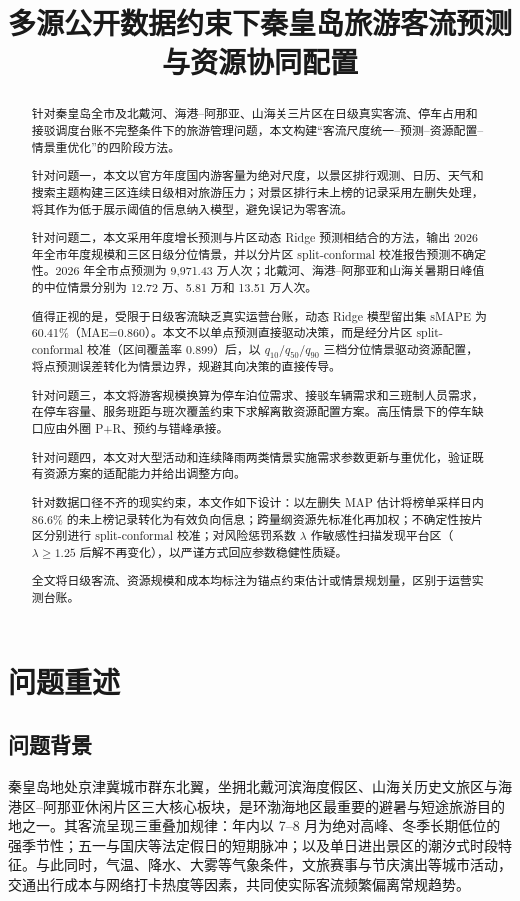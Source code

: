 \documentclass[withoutpreface,bwprint]{cumcmthesis}
\title{多源公开数据约束下秦皇岛旅游客流预测与资源协同配置}
\begin{document}
\maketitle

\begin{abstract}
针对秦皇岛全市及北戴河、海港--阿那亚、山海关三片区在日级真实客流、停车占用和接驳调度台账不完整条件下的旅游管理问题，本文构建“客流尺度统一--预测--资源配置--情景重优化”的四阶段方法。

针对问题一，本文以官方年度国内游客量为绝对尺度，以景区排行观测、日历、天气和搜索主题构建三区连续日级相对旅游压力；对景区排行未上榜的记录采用左删失处理，将其作为低于展示阈值的信息纳入模型，避免误记为零客流。

针对问题二，本文采用年度增长预测与片区动态 Ridge 预测相结合的方法，输出 2026 年全市年度规模和三区日级分位情景，并以分片区 split-conformal 校准报告预测不确定性。2026 年全市点预测为 9,971.43 万人次；北戴河、海港--阿那亚和山海关暑期日峰值的中位情景分别为 12.72 万、5.81 万和 13.51 万人次。

值得正视的是，受限于日级客流缺乏真实运营台账，动态 Ridge 模型留出集 sMAPE 为 60.41\%（MAE=0.860）。本文不以单点预测直接驱动决策，而是经分片区 split-conformal 校准（区间覆盖率 0.899）后，以 $q_{10}/q_{50}/q_{90}$ 三档分位情景驱动资源配置，将点预测误差转化为情景边界，规避其向决策的直接传导。

针对问题三，本文将游客规模换算为停车泊位需求、接驳车辆需求和三班制人员需求，在停车容量、服务班距与班次覆盖约束下求解离散资源配置方案。高压情景下的停车缺口应由外圈 P+R、预约与错峰承接。

针对问题四，本文对大型活动和连续降雨两类情景实施需求参数更新与重优化，验证既有资源方案的适配能力并给出调整方向。

针对数据口径不齐的现实约束，本文作如下设计：以左删失 MAP 估计将榜单采样日内 86.6\% 的未上榜记录转化为有效负向信息；跨量纲资源先标准化再加权；不确定性按片区分别进行 split-conformal 校准；对风险惩罚系数 $\lambda$ 作敏感性扫描发现平台区（$\lambda\ge1.25$ 后解不再变化），以严谨方式回应参数稳健性质疑。

全文将日级客流、资源规模和成本均标注为锚点约束估计或情景规划量，区别于运营实测台账。

\end{abstract}

\section{问题重述}
\subsection{问题背景}
秦皇岛地处京津冀城市群东北翼，坐拥北戴河滨海度假区、山海关历史文旅区与海港区--阿那亚休闲片区三大核心板块，是环渤海地区最重要的避暑与短途旅游目的地之一。其客流呈现三重叠加规律：年内以 7--8 月为绝对高峰、冬季长期低位的强季节性；五一与国庆等法定假日的短期脉冲；以及单日进出景区的潮汐式时段特征。与此同时，气温、降水、大雾等气象条件，文旅赛事与节庆演出等城市活动，交通出行成本与网络打卡热度等因素，共同使实际客流频繁偏离常规趋势。
\end{document}
